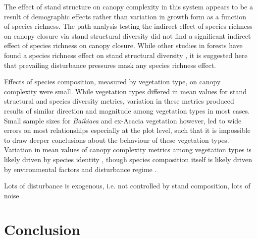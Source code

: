 \documentclass[11pt,a4paper]{article}
\begin{document}
The effect of stand structure on canopy complexity in this system appears to be a result of demographic effects rather than variation in growth form as a function of species richness. The path analysis testing the indirect effect of species richness on canopy closure via stand structural diversity did not find a significant indirect effect of species richness on canopy closure. While other studies in forests have found a species richness effect on stand structural diversity \citep{}, it is suggested here that prevailing disturbance pressures mask any species richness effect.

Effects of species composition, measured by vegetation type, on canopy complexity were small. While vegetation types differed in mean values for stand structural and species diversity metrics, variation in these metrics produced results of similar direction and magnitude among vegetation types in most cases. Small sample sizes for \textit{Baikiaea} and ex-Acacia vegetation however, led to wide errors on most relationships especially at the plot level, such that it is impossible to draw deeper conclusions about the behaviour of these vegetation types. Variation in mean values of canopy complexity metrics among vegetation types is likely driven by species identity \citep{}, though species composition itself is likely driven by environmental factors and disturbance regime \citep{}. 


Lots of disturbance is exogenous, i.e. not controlled by stand composition, lots of noise

\section{Conclusion}

\printbibliography



\end{document}
